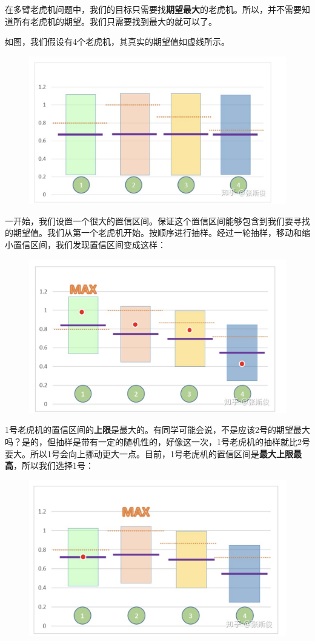 \documentclass[12pt]{article}
\begin{document}
在多臂老虎机问题中，我们的目标只需要找\textbf{期望最大}的老虎机。所以，并不需要知道所有老虎机的期望。我们只需要找到最大的就可以了。

如图，我们假设有4个老虎机，其真实的期望值如虚线所示。
\begin{figure}[H]
    \centering
    \includegraphics[width=.6\textwidth]{fig/ReinforcementLearning/AlphaZero_UCB_Confidence_Interval_2.png}
\end{figure}

一开始，我们设置一个很大的置信区间。保证这个置信区间能够包含到我们要寻找的期望值。我们从第一个老虎机开始。按顺序进行抽样。经过一轮抽样，移动和缩小置信区间，我们发现置信区间变成这样：
\begin{figure}[H]
    \centering
    \includegraphics[width=.6\textwidth]{fig/ReinforcementLearning/AlphaZero_UCB_Confidence_Interval_3.png}
\end{figure}

1号老虎机的置信区间的\textbf{上限}是最大的。有同学可能会说，不是应该2号的期望最大吗？是的，但抽样是带有一定的随机性的，好像这一次，1号老虎机的抽样就比2号要大。所以1号会向上挪动更大一点。目前，1号老虎机的置信区间是\textbf{最大上限最高}，所以我们选择1号：
\begin{figure}[H]
    \centering
    \includegraphics[width=.6\textwidth]{fig/ReinforcementLearning/AlphaZero_UCB_Confidence_Interval_4.png}
\end{figure}
\end{document}
